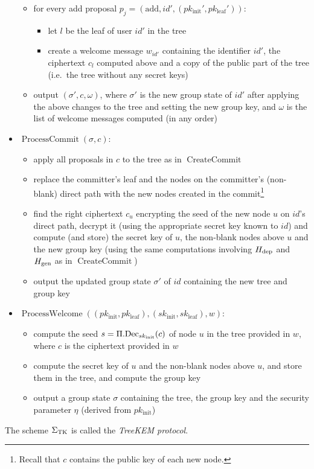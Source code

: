 \begin{definition}
\begin{itemize}
\begin{itemize}
			      \item for every add proposal $p_j = (\mathrm{add}, id', (pk_{\mathrm{init}}', pk_{\mathrm{leaf}}'))$:
			            \begin{itemize}
				            \item let $l$ be the leaf of user $id'$ in the tree
				            \item create a welcome message $w_{id'}$ containing the identifier $id'$, the ciphertext $c_l$ computed above and a copy of the public part of the tree (i.e.\ the tree without any secret keys)
			            \end{itemize}
			      \item output $(\sigma', c, \omega)$, where $\sigma'$ is the new group state of $id'$ after applying the above changes to the tree and setting the new group key, and $\omega$ is the list of welcome messages computed (in any order)
		      \end{itemize}
		\item $\operatorname{ProcessCommit}(\sigma, c)$:
		      \begin{itemize}
			      \item apply all proposals in $c$ to the tree as in $\operatorname{CreateCommit}$
			      \item replace the committer's leaf and the nodes on the committer's (non-blank) direct path with the new nodes created in the commit\footnote{Recall that $c$ contains the public key of each new node.}
			      \item find the right ciphertext $c_u$ encrypting the seed of the new node $u$ on $id$'s direct path, decrypt it (using the appropriate secret key known to $id$) and compute (and store) the secret key of $u$, the non-blank nodes above $u$ and the new group key (using the same computations involving $H_\mathrm{dep}$ and $H_\mathrm{gen}$ as in $\operatorname{CreateCommit}$)
			      \item output the updated group state $\sigma'$ of $id$ containing the new tree and group key
		      \end{itemize}
		\item $\operatorname{ProcessWelcome}((pk_{\mathrm{init}}, pk_{\mathrm{leaf}}), (sk_{\mathrm{init}}, sk_{\mathrm{leaf}}), w)$:
		      \begin{itemize}
			      \item compute the seed $s = \Pi.\mathrm{Dec}_{sk_{\mathrm{init}}}(c)$ of node $u$ in the tree provided in $w$, where $c$ is the ciphertext provided in $w$
			      \item compute the secret key of $u$ and the non-blank nodes above $u$, and store them in the tree, and compute the group key
			      \item output a group state $\sigma$ containing the tree, the group key and the security parameter $\eta$ (derived from $pk_{\mathrm{init}}$)
		      \end{itemize}
	\end{itemize}
	The scheme $\Sigma_{\mathrm{TK}}$ is called the \emph{TreeKEM protocol}.
\end{definition}

